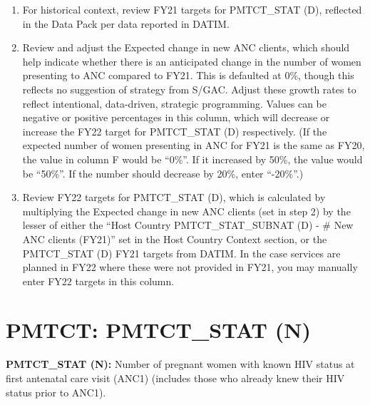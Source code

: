 \documentclass[
  openany]{book}
\begin{document}
\begin{enumerate}
\def\labelenumi{\arabic{enumi}.}
\item
  For historical context, review FY21 targets for PMTCT\_STAT (D),
  reflected in the Data Pack per data reported in DATIM.
\item
  Review and adjust the Expected change in new ANC clients, which
  should help indicate whether there is an anticipated change in the
  number of women presenting to ANC compared to FY21. This is
  defaulted at 0\%, though this reflects no suggestion of strategy from
  S/GAC. Adjust these growth rates to reflect intentional,
  data-driven, strategic programming. Values can be negative or
  positive percentages in this column, which will decrease or increase
  the FY22 target for PMTCT\_STAT (D) respectively. (If the expected
  number of women presenting in ANC for FY21 is the same as FY20, the
  value in column F would be ``0\%''. If it increased by 50\%, the value
  would be ``50\%''. If the number should decrease by 20\%, enter ``-20\%''.)
\item
  Review FY22 targets for PMTCT\_STAT (D), which is calculated by
  multiplying the Expected change in new ANC clients (set in step 2)
  by the lesser of either the ``Host Country PMTCT\_STAT\_SUBNAT (D) - \#
  New ANC clients (FY21)'' set in the Host Country Context section, or
  the PMTCT\_STAT (D) FY21 targets from DATIM. In the case services are
  planned in FY22 where these were not provided in FY21, you may
  manually enter FY22 targets in this column.
\end{enumerate}

\hypertarget{pmtct-pmtct_stat-n}{%
\section{PMTCT: PMTCT\_STAT (N)}\label{pmtct-pmtct_stat-n}}

\textbf{PMTCT\_STAT (N):} Number of pregnant women with known HIV status at
first antenatal care visit (ANC1) (includes those who already knew their
HIV status prior to ANC1).
\end{document}
